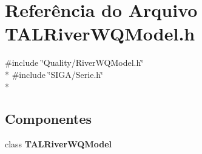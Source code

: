 \section{Referência do Arquivo T\+A\+L\+River\+W\+Q\+Model.\+h}
\label{_t_a_l_river_w_q_model_8h}
{\ttfamily \#include \char`\"{}Quality/\+River\+W\+Q\+Model.\+h\char`\"{}}\\*
{\ttfamily \#include \char`\"{}S\+I\+G\+A/\+Serie.\+h\char`\"{}}\\*
\subsection*{Componentes}
\begin{DoxyCompactItemize}
\item 
class {\bf T\+A\+L\+River\+W\+Q\+Model}
\end{DoxyCompactItemize}
